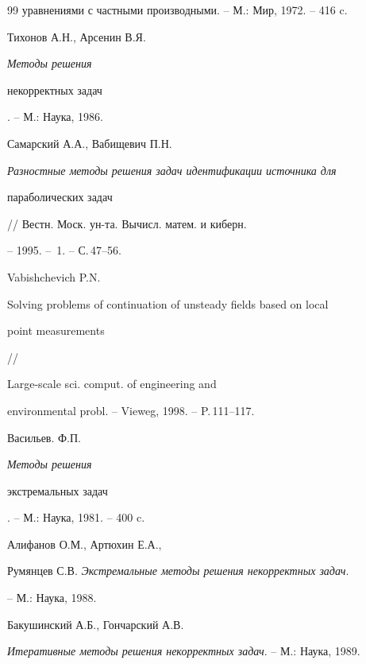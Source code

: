 \begin{thebibliography}{99}
{уравнениями с частными производными}. -- М.: Мир, 1972. -- 416 c.







Тихонов А.Н., Арсенин В.Я. {\it Методы решения


некорректных задач}. --  М.: Наука, 1986.







Самарский А.А., Вабищевич П.Н.


{\it Разностные методы решения задач идентификации источника для


параболических задач} // Вестн. Моск. ун-та. Вычисл. матем. и киберн.


-- 1995. -- \No\,1. -- С.\,47--56.







Vabishchevich P.N. {\it


Solving problems of continuation of unsteady fields based on local


point measurements} //


Large-scale sci. comput. of engineering and


environmental probl. -- Vieweg, 1998. -- P.\,111--117. 







Васильев. Ф.П. {\it Методы решения


экстремальных задач}. -- М.: Наука, 1981. -- 400 c.







Алифанов О.М., Артюхин Е.А.,


Румянцев С.В. {\it Экстремальные методы решения некорректных задач}.


-- М.: Наука,  1988.







Бакушинский А.Б.,  Гончарский А.В.


{\it Итеративные методы решения некорректных задач}. -- М.: Наука, 1989.








\end{thebibliography}
